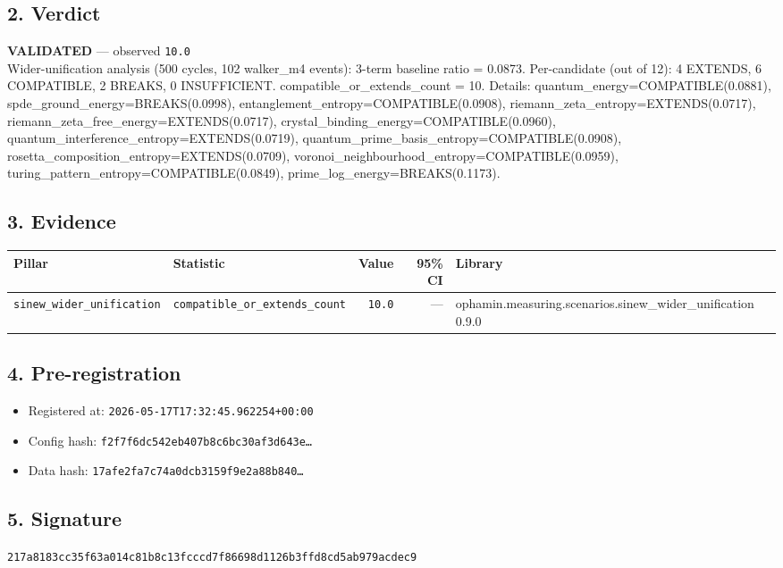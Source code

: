 \documentclass{article}
\begin{document}
\subsection*{2. Verdict}
\textcolor{validated}{\textbf{VALIDATED}} --- observed \texttt{10.0}\\
Wider-unification analysis (500 cycles, 102 walker\_m4 events): 3-term baseline ratio = 0.0873. Per-candidate (out of 12): 4 EXTENDS, 6 COMPATIBLE, 2 BREAKS, 0 INSUFFICIENT. compatible\_or\_extends\_count = 10. Details: quantum\_energy=COMPATIBLE(0.0881), spde\_ground\_energy=BREAKS(0.0998), entanglement\_entropy=COMPATIBLE(0.0908), riemann\_zeta\_entropy=EXTENDS(0.0717), riemann\_zeta\_free\_energy=EXTENDS(0.0717), crystal\_binding\_energy=COMPATIBLE(0.0960), quantum\_interference\_entropy=EXTENDS(0.0719), quantum\_prime\_basis\_entropy=COMPATIBLE(0.0908), rosetta\_composition\_entropy=EXTENDS(0.0709), voronoi\_neighbourhood\_entropy=COMPATIBLE(0.0959), turing\_pattern\_entropy=COMPATIBLE(0.0849), prime\_log\_energy=BREAKS(0.1173).
\subsection*{3. Evidence}
\begin{tabular}{llrrl}\toprule
\textbf{Pillar} & \textbf{Statistic} & \textbf{Value} & \textbf{95\% CI} & \textbf{Library} \\\midrule
\texttt{sinew\_wider\_unification} & \texttt{compatible\_or\_extends\_count} & \texttt{10.0} & --- & ophamin.measuring.scenarios.sinew\_wider\_unification 0.9.0 \\
\bottomrule\end{tabular}
\subsection*{4. Pre-registration}
\begin{itemize}
\item Registered at: \texttt{2026-05-17T17:32:45.962254+00:00}
\item Config hash: \texttt{f2f7f6dc542eb407b8c6bc30af3d643e\dots}
\item Data hash: \texttt{17afe2fa7c74a0dcb3159f9e2a88b840\dots}
\end{itemize}
\subsection*{5. Signature}
\texttt{217a8183cc35f63a014c81b8c13fcccd7f86698d1126b3ffd8cd5ab979acdec9}\\
\end{document}
